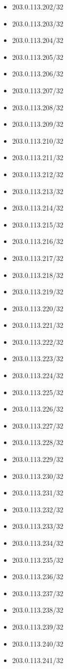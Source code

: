 \documentclass[a4paper,10pt]{article}
\begin{document}
\begin{itemize}
  \item 203.0.113.202/32
  \item 203.0.113.203/32
  \item 203.0.113.204/32
  \item 203.0.113.205/32
  \item 203.0.113.206/32
  \item 203.0.113.207/32
  \item 203.0.113.208/32
  \item 203.0.113.209/32
  \item 203.0.113.210/32
  \item 203.0.113.211/32
  \item 203.0.113.212/32
  \item 203.0.113.213/32
  \item 203.0.113.214/32
  \item 203.0.113.215/32
  \item 203.0.113.216/32
  \item 203.0.113.217/32
  \item 203.0.113.218/32
  \item 203.0.113.219/32
  \item 203.0.113.220/32
  \item 203.0.113.221/32
  \item 203.0.113.222/32
  \item 203.0.113.223/32
  \item 203.0.113.224/32
  \item 203.0.113.225/32
  \item 203.0.113.226/32
  \item 203.0.113.227/32
  \item 203.0.113.228/32
  \item 203.0.113.229/32
  \item 203.0.113.230/32
  \item 203.0.113.231/32
  \item 203.0.113.232/32
  \item 203.0.113.233/32
  \item 203.0.113.234/32
  \item 203.0.113.235/32
  \item 203.0.113.236/32
  \item 203.0.113.237/32
  \item 203.0.113.238/32
  \item 203.0.113.239/32
  \item 203.0.113.240/32
  \item 203.0.113.241/32

\end{itemize}
\end{document}
